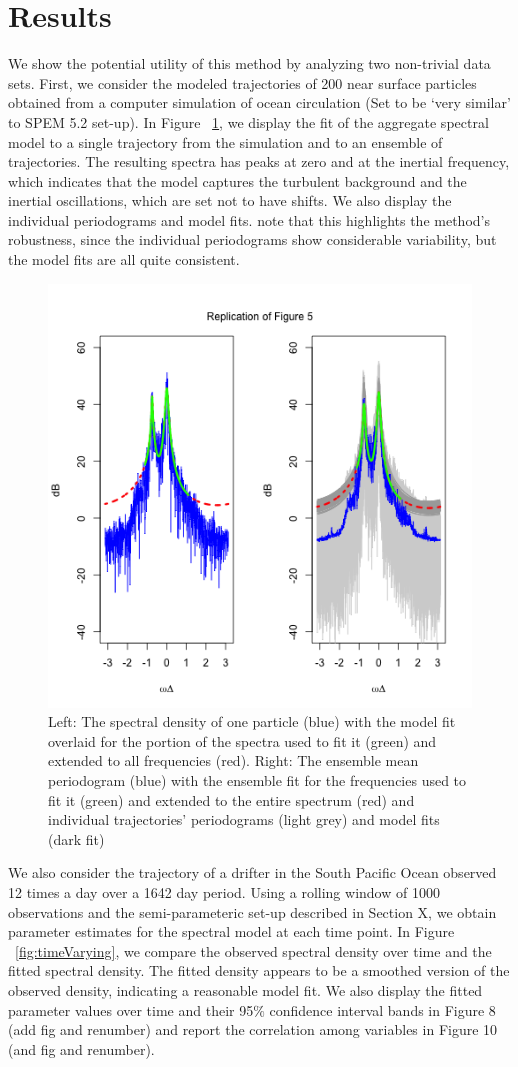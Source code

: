 \documentclass{stat572Style}
\begin{document}
\section{Results}
We show the potential utility of this method by analyzing two non-trivial data sets.  First, we consider the modeled trajectories of 200 near surface particles obtained from a computer simulation of ocean circulation (Set to be `very similar' to \citet{Danioux2008} SPEM 5.2 set-up). In Figure ~\ref{fig:numSim}, we display the fit of the aggregate spectral model to a single trajectory from the simulation and to an ensemble of trajectories. The resulting spectra has peaks at zero and at the inertial frequency, which indicates that the model captures the turbulent background and the inertial oscillations, which are set not to have shifts. We also display the individual periodograms and model fits. \citet{Sykulski2016}  note that this highlights the method's robustness, since the individual periodograms show considerable variability, but the model fits are all quite consistent.
\begin{figure}[hb]
	\label{fig:numSim}
  \centering
    \includegraphics[width=.5\textwidth]{fig5.png}
        \caption{Left: The spectral density of one particle (blue) with the model fit overlaid for the portion of the spectra used to fit it (green) and extended to all frequencies (red). Right: The ensemble mean periodogram (blue) with the ensemble fit for the frequencies used to fit it (green) and extended to the entire spectrum (red) and individual trajectories' periodograms (light grey) and model fits (dark fit) }
\end{figure}

We also consider the trajectory of a drifter in the South Pacific Ocean observed 12 times a day over a 1642 day period. Using a rolling window of 1000 observations and the semi-parameteric set-up described in Section X, we obtain parameter estimates for the spectral model at each time point. In Figure ~\ref{fig:timeVarying}, we compare the observed spectral density over time and the fitted spectral density. The fitted density appears to be a smoothed version of the observed density, indicating a reasonable model fit. We also display the fitted parameter values over time and their 95$\%$ confidence interval bands in Figure 8 (add fig and renumber) and report the correlation among variables in Figure 10 (and fig and renumber). 
\end{document}
